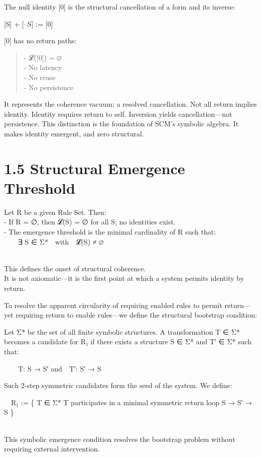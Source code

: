 The null identity {[}0{]} is the structural cancellation of a form and
its inverse:

{[}S{]} + {[}--S{]} := {[}0{]}

{[}0{]} has no return paths:

\begin{quote}
- 𝓛({[}0{]}) = ∅\\
- No latency\\
- No reuse\\
- No persistence
\end{quote}

It represents the coherence vacuum: a resolved cancellation. Not all
return implies identity. Identity requires return to self. Inversion
yields cancellation---not persistence. This distinction is the
foundation of SCM's symbolic algebra. It makes identity emergent, and
zero structural.

\section{1.5 \textbar{} Structural Emergence
Threshold}\label{structural-emergence-threshold}

Let R be a given Rule Set. Then:\\
- If R = ∅, then 𝓛(S) = ∅ for all S; no identities exist.\\
- The emergence threshold is the minimal cardinality of R such that:\\
  ∃ S ∈ Σ* with 𝓛(S) ≠ ∅\\
\strut \\
This defines the onset of structural coherence.\\
It is not axiomatic---it is the first point at which a system permits
identity by return.

To resolve the apparent circularity of requiring enabled rules to permit
return---yet requiring return to enable rules---we define the structural
bootstrap condition:

Let Σ* be the set of all finite symbolic structures. A transformation T
∈ Σ* becomes a candidate for R₁ if there exists a structure S ∈ Σ* and
T′ ∈ Σ* such that:

  T: S → S′ and T′: S′ → S

Such 2-step symmetric candidates form the seed of the system. We define:

 R₁ := \{ T ∈ Σ* \textbar{} T participates in a minimal symmetric return
loop S → S′ → S \}\\
\strut \\
This symbolic emergence condition resolves the bootstrap problem without
requiring external intervention.

